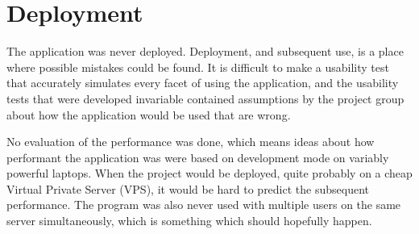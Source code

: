 \section{Deployment}
The application was never deployed.
Deployment, and subsequent use, is a place where possible mistakes could be found.
It is difficult to make a usability test that accurately simulates every facet of using the application, and the usability tests that were developed invariable contained assumptions by the project group about how the application would be used that are wrong.

No evaluation of the performance was done, which means ideas about how performant the application was were based on development mode on variably powerful laptops.
When the project would be deployed, quite probably on a cheap Virtual Private Server (VPS), it would be hard to predict the subsequent performance.
The program was also never used with multiple users on the same server simultaneously, which is something which should hopefully happen.
